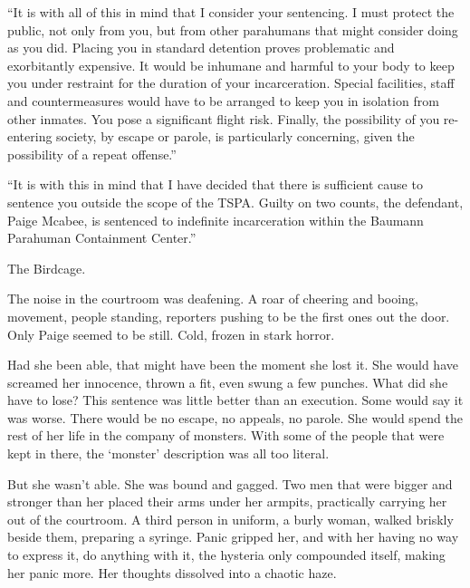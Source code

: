 ``It is with all of this in mind that I consider your sentencing.  I must protect the public, not only from you, but from other parahumans that might consider doing as you did.  Placing you in standard detention proves problematic and exorbitantly expensive.  It would be inhumane and harmful to your body to keep you under restraint for the duration of your incarceration.  Special facilities, staff and countermeasures would have to be arranged to keep you in isolation from other inmates.  You pose a significant flight risk.  Finally, the possibility of you re-entering society, by escape or parole, is particularly concerning, given the possibility of a repeat offense.''



``It is with this in mind that I have decided that there is sufficient cause to sentence you outside the scope of the TSPA.  Guilty on two counts, the defendant, Paige Mcabee, is sentenced to indefinite incarceration within the Baumann Parahuman Containment Center.''



The Birdcage.



The noise in the courtroom was deafening.  A roar of cheering and booing, movement, people standing, reporters pushing to be the first ones out the door.  Only Paige seemed to be still.  Cold, frozen in stark horror.



Had she been able, that might have been the moment she lost it.  She would have screamed her innocence, thrown a fit, even swung a few punches.  What did she have to lose?  This sentence was little better than an execution.  Some would say it was worse.  There would be no escape, no appeals, no parole.  She would spend the rest of her life in the company of monsters.  With some of the people that were kept in there, the `monster' description was all too literal.



But she wasn't able.  She was bound and gagged.  Two men that were bigger and stronger than her placed their arms under her armpits, practically carrying her out of the courtroom.  A third person in uniform, a burly woman, walked briskly beside them, preparing a syringe.  Panic gripped her, and with her having no way to express it, do anything with it, the hysteria only compounded itself, making her panic more.  Her thoughts dissolved into a chaotic haze.



